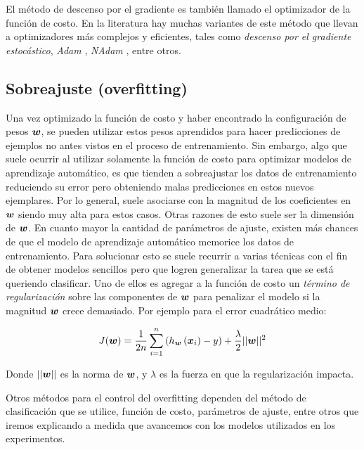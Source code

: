 El método de descenso por el gradiente es también llamado el optimizador de la
función de costo. En la literatura hay muchas variantes de este método que
llevan a optimizadores más complejos y eficientes, tales como \emph{descenso por
el gradiente estocástico}\citep{Kiefer-1952}, \emph{Adam} \citep{kingma-adam-2017}, \emph{NAdam}
\citep{zhang-2018}, entre otros.

\subsection{Sobreajuste (overfitting)}

Una vez optimizado la función de costo y haber encontrado la configuración de
pesos $\boldsymbol{w}$, se pueden utilizar estos pesos aprendidos para hacer
predicciones de ejemplos no antes vistos en el proceso de entrenamiento. Sin
embargo, algo que suele ocurrir al utilizar solamente la función de costo para
optimizar modelos de aprendizaje automático, es que tienden a sobreajustar los
datos de entrenamiento reduciendo su error pero obteniendo malas predicciones en
estos nuevos ejemplares. Por lo general, suele asociarse con la magnitud de los
coeficientes en $\boldsymbol{w}$ siendo muy alta para estos casos. Otras razones de
esto suele ser la dimensión de $\boldsymbol{w}$. En cuanto mayor la cantidad de
parámetros de ajuste, existen más chances de que el modelo de aprendizaje
automático memorice los datos de entrenamiento. Para solucionar esto se suele
recurrir a varias técnicas con el fin de obtener modelos sencillos pero que
logren generalizar la tarea que se está queriendo clasificar. Uno de ellos es
agregar a la función de costo un \emph{término de regularización} sobre las
componentes de $\boldsymbol{w}$ para penalizar el modelo si la magnitud $\boldsymbol{w}$
crece demasiado. Por ejemplo para el error cuadrático medio:

\begin{align}
    J(\boldsymbol{w}) = \frac{1}{2n} \sum_{i=1}^{n}\left( h_{\boldsymbol{w}}\left( \boldsymbol{x}_{i}\right) - y \right) +
                  \frac{\lambda}{2} ||\boldsymbol{w}||^{2}
\end{align}

Donde $||\boldsymbol{w}||$ es la norma de $\boldsymbol{w}$, y $\lambda$ es la fuerza en que
la regularización impacta.

Otros métodos para el control del overfitting dependen del método de
clasificación que se utilice, función de costo, parámetros de ajuste, entre
otros que iremos explicando a medida que avancemos con los modelos utilizados en
los experimentos.

